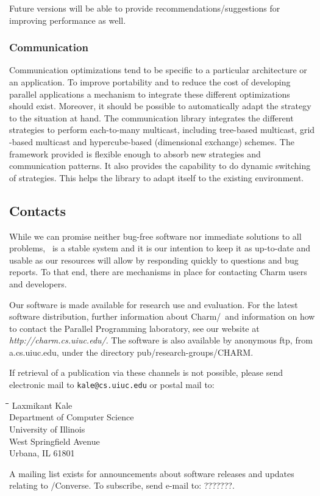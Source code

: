 Future versions will be able to provide recommendations/suggestions
for improving performance as well.

\subsubsection{Communication}
Communication optimizations tend to be specific to a particular
architecture or an application. To improve portability and to reduce the
cost of developing parallel applications a mechanism to integrate these
different optimizations should exist. Moreover, it should be possible to
automatically adapt the strategy to the situation at hand. The
communication library integrates the different strategies to perform
each-to-many multicast, including tree-based multicast, grid -based
multicast and hypercube-based (dimensional exchange) schemes. The
framework provided is flexible enough to absorb new strategies and
communication patterns. It also provides the capability to do dynamic
switching of strategies. This helps the library to adapt itself to the
existing environment.

\subsection{Contacts}
\label{Distribution}

While we can promise neither bug-free software nor immediate solutions   
to all problems, \charmpp\ is a stable system and it is our intention to
keep it as up-to-date and usable as our resources will allow
by responding quickly to questions and bug reports.  To that
end, there are mechanisms in place for contacting Charm users
and developers. 

Our software is made available for research use and evaluation.
For the latest software distribution, further information about {\sc
Charm}/\charmpp\ and information on how to contact the Parallel
Programming laboratory, see our website at {\it
http://charm.cs.uiuc.edu/}.  The software is also available by
anonymous ftp, from a.cs.uiuc.edu, under the directory
pub/research-groups/CHARM.  

If retrieval of a publication via these channels is not possible,
please send electronic mail to {\tt kale@cs.uiuc.edu} or postal mail to:

{\bf 
\begin{tabbing}
\hspace{0.5in}\=\hspace{0.3in}\=\hspace{0.3in}\=\hspace{0.3in}\= \kill
\> Laxmikant Kale \\
\> Department of Computer Science \\
\> University of Illinois \\
 West Springfield Avenue \\
\> Urbana, IL 61801 \\
\end{tabbing}
}

A mailing list exists for announcements about software releases and
updates relating to \charmpp/{\sc Converse}.  To subscribe, send
e-mail to: ???????.
